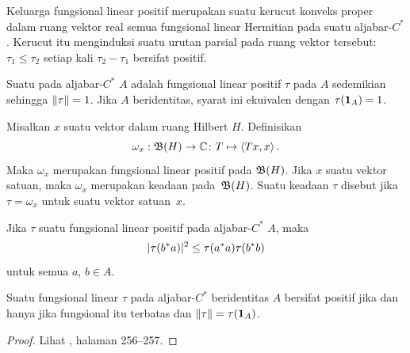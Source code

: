 \begin{prop} Keluarga fungsional linear positif merupakan suatu kerucut konveks proper dalam ruang
vektor real semua fungsional linear Hermitian pada suatu aljabar-$C^*$. Kerucut itu menginduksi suatu
urutan parsial pada ruang vektor tersebut: $\tau_1 \le \tau_2$ setiap kali $\tau_2 - \tau_1$
bersifat positif.
\end{prop}

\begin{defn} Suatu
 pada aljabar-$C^*$ $A$ adalah fungsional linear positif $\tau$ pada $A$ sedemikian sehingga
$\lVert\tau\rVert = 1$. Jika $A$ beridentitas, syarat ini ekuivalen dengan $\tau(\mathbf{1}_A) = 1$.
\end{defn}

\begin{exam} Misalkan $x$ suatu vektor dalam ruang Hilbert $H$. Definisikan
   \[ \omega_x:\mathfrak{B}(H) \rightarrow \mathbb{C}\colon T \mapsto \langle Tx,x \rangle\,. \]
Maka $\omega_x$ merupakan fungsional linear positif pada $\mathfrak{B}(H)$. Jika $x$ suatu
vektor satuan, maka $\omega_x$ merupakan keadaan pada~$\mathfrak{B}(H)$. Suatu keadaan $\tau$ disebut
 jika $\tau = \omega_x$ untuk suatu vektor satuan~$x$.
\end{exam}

\begin{prop}\label{0025105} Jika $\tau$ suatu fungsional linear positif pada
aljabar-$C^*$ $A$, maka
   \[ \lvert\tau(b^*a)\rvert^2 \le \tau(a^*a)\tau(b^*b) \]
untuk semua $a$, $b \in A$.
\end{prop}

\begin{prop} Suatu fungsional linear $\tau$ pada aljabar-$C^*$ beridentitas $A$ bersifat positif jika dan hanya jika
fungsional itu terbatas dan $\lVert\tau\rVert = \tau(\mathbf{1}_A)$.
\end{prop}

\begin{proof} Lihat \cite{KadisonR:1983}, halaman 256--257. \ns
\end{proof}



















